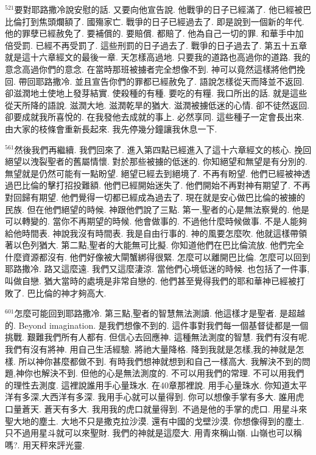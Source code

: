\documentclass{book}
\begin{document}
$^{521}$要對耶路撒冷說安慰的話.
又要向他宣告說.
他戰爭的日子已經滿了.
他已經被巴比倫打到焦頭爛額了.
國殤家亡.
戰爭的日子已經過去了.
即是說到一個新的年代.
他的罪孽已經赦免了.
要補償的.
要賠償.
都賠了.
他為自己一切的罪.
和華手中加倍受罰.
已經不再受罰了.
這些刑罰的日子過去了.
戰爭的日子過去了.
第五十五章就是這十六章經文的最後一章.
天怎樣高過地.
只要我的道路也高過你的道路.
我的意念高過你們的意念.
在當時那班被擄者完全想像不到.
神可以竟然這樣將他們挽回.
帶回耶路撒冷.
並且宣告你們的罪都已經赦免了.
語說怎樣從天而降並不返回.
卻滋潤地土使地上發芽結實.
使殺種的有種.
要吃的有糧.
我口所出的話.
就是這些從天所降的語說.
滋潤大地.
滋潤乾旱的猶大.
滋潤被擄低迷的心情.
卻不徒然返回.
卻要成就我所喜悅的.
在我發他去成就的事上.
必然享同.
這些種子一定會長出來.
由大家的枝條會重新長起來.
我先停幾分鐘讓我休息一下.

$^{561}$然後我們再繼續.
我們回來了.
進入第四點已經進入了這十六章經文的核心.
挽回絕望以洩裂聖者的舊屬情懷.
對於那些被擄的低迷的.
你知絕望和無望是有分別的.
無望就是仍然可能有一點盼望.
絕望已經去到絕境了.
不再有盼望.
他們已經被神透過巴比倫的擊打招投難額.
他們已經開始迷失了.
他們開始不再對神有期望了.
不再對回歸有期望.
他們覺得一切都已經成為過去了.
現在就是安心做巴比倫的被擄的民族.
但在他們絕望的時候.
神跟他們說了三點.
第一,聖者的心是無法察覺的.
他是可以轉變的.
當你不再期望的時候.
他會做事的.
不過他什麼時候做事.
不是人能夠給他時間表.
神說我沒有時間表.
我是自由行事的.
神的風要怎麼吹.
他就這樣帶領著以色列猶大.
第二點,聖者的大能無可比擬.
你知道他們在巴比倫流放.
他們完全什麼資源都沒有.
他們好像被大閘蟹綁得很緊.
怎麼可以離開巴比倫.
怎麼可以回到耶路撒冷.
路又這麼遠.
我們又這麼淒涼.
當他們心境低迷的時候.
也包括了一件事,叫做自戀.
猶大當時的處境是非常自戀的.
他們甚至覺得我們的耶和華神已經被打敗了.
巴比倫的神才夠高大.

$^{601}$怎麼可能回到耶路撒冷.
第三點,聖者的智慧無法測讀.
他這樣才是聖者.
是超越的.
Beyond imagination.
是我們想像不到的.
這件事對我們每一個基督徒都是一個挑戰.
艱難我們所有人都有.
但信心去回應神.
這種無法測度的智慧.
我們有沒有呢.
我們有沒有將神.
用自己生活經驗.
將祂大量降格.
降到我就是怎樣,我的神就是怎樣.
所以神你甚麼都做不到.
有時我們想神就想到和自己一樣高大.
我解決不到的問題,神你也解決不到.
但他的心是無法測度的.
不可以用我們的常理.
不可以用我們的理性去測度.
這裡說誰用手心量珠水.
在40章那裡說.
用手心量珠水.
你知道太平洋有多深,大西洋有多深.
我用手心就可以量得到.
你可以想像手掌有多大.
誰用虎口量蒼天.
蒼天有多大.
我用我的虎口就量得到.
不過是他的手掌的虎口.
用星斗來聖大地的塵土.
大地不只是撒克拉沙漠.
還有中國的戈壁沙漠.
你想像得到的塵土.
只不過用星斗就可以來聖財.
我們的神就是這麼大.
用青來稱山嶺.
山嶺也可以稱嗎?.
用天秤來評光靈.
\end{document}
